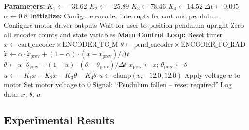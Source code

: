 \begin{algorithm}
\caption{Inverted Pendulum State Feedback Controller}
\label{alg:pendulum_controller}
\begin{algorithmic}[1]
\State \textbf{Parameters:}
\State \quad $K_1 \gets -31.62$ 
\State \quad $K_2 \gets -25.89$ 
\State \quad $K_3 \gets 78.46$ 
\State \quad $K_4 \gets 14.52$ 
\State \quad $\Delta t \gets 0.005$ 
\State \quad $\alpha \gets 0.8$ 
\State
\State \textbf{Initialize:}
\State \quad Configure encoder interrupts for cart and pendulum
\State \quad Configure motor driver outputs
\State \quad Wait for user to position pendulum upright
\State \quad Zero all encoder counts and state variables
\State
\State \textbf{Main Control Loop:}
        \State Reset timer
        \State
        \State {}
        \State $x \gets \text{cart\_encoder} \times \text{ENCODER\_TO\_M}$
        \State $\theta \gets \text{pend\_encoder} \times \text{ENCODER\_TO\_RAD}$
        \State
        \State {}
        \State $\dot{x} \gets \alpha \cdot \dot{x}_{\text{prev}} + (1-\alpha) \cdot (x - x_{\text{prev}}) / \Delta t$
        \State $\dot{\theta} \gets \alpha \cdot \dot{\theta}_{\text{prev}} + (1-\alpha) \cdot (\theta - \theta_{\text{prev}}) / \Delta t$
        \State $x_{\text{prev}} \gets x$; \quad $\theta_{\text{prev}} \gets \theta$
        \State
        \State {}
        \State $u \gets -K_1 x - K_2 \dot{x} - K_3 \theta - K_4 \dot{\theta}$
        \State
        \State {}
        \State $u \gets \text{clamp}(u, -12.0, 12.0)$
        \State
        \State {}
            \State Apply voltage $u$ to motor
        \Else
            \State Set motor voltage to 0
            \State Signal: ``Pendulum fallen -- reset required''
        \EndIf
        \State
        \State Log data: $x$, $\theta$, $u$
    \EndIf
\EndWhile
\end{algorithmic}
\end{algorithm}

\subsection{Experimental Results}

